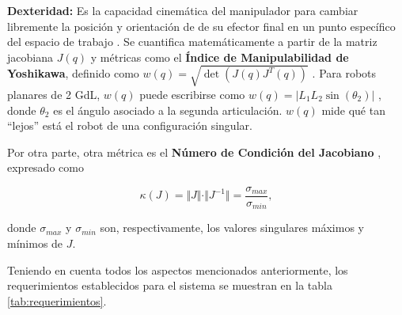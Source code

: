 \documentclass[10pt, letterpaper]{article}
\begin{document}
\textbf{Dexteridad: } Es la capacidad cinemática del manipulador para cambiar libremente la posición y orientación de de su efector final en un punto específico del espacio de trabajo \cite{spong}. Se cuantifica matemáticamente a partir de la matriz jacobiana $J(q)$ y métricas como el \textbf{Índice de Manipulabilidad de Yoshikawa}, definido como $w(q) = \sqrt{\det(J(q)J^T(q))}$ \cite{spong}. Para robots planares de 2 GdL, $w(q)$ puede escribirse como $w(q) = \vert L_1L_2\sin(\theta_2) \vert$ \cite{spong}, donde $\theta_2$ es el ángulo asociado a la segunda articulación. $w(q)$ mide qué tan ``lejos'' está el robot de una configuración singular. 

Por otra parte, otra métrica es el \textbf{Número de Condición del Jacobiano} \cite{spong}, expresado como
 
\begin{equation*}
   \kappa(J) = \Vert J \Vert \cdot \Vert J^{-1} \Vert = \frac{\sigma_{max}}{\sigma_{min}},
\end{equation*}

donde $\sigma_{max}$ y $\sigma_{min}$ son, respectivamente, los valores singulares máximos y mínimos de $J$. 

Teniendo en cuenta todos los aspectos mencionados anteriormente, los requerimientos establecidos para el sistema se muestran en la tabla \ref{tab:requerimientos}.
\end{document}
